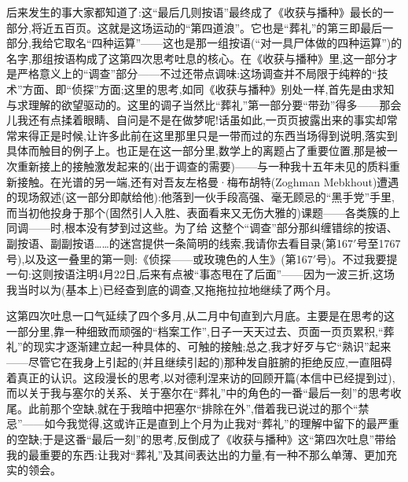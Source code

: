 后来发生的事大家都知道了:这“最后几则按语”最终成了《收获与播种》最长的一部分,将近五百页。这就是这场运动的“第四道浪”。它也是“葬礼”的第三即最后一部分,我给它取名“四种运算”——这也是那一组按语(“对一具尸体做的四种运算”)的名字,那组按语构成了这第四次思考吐息的核心。在《收获与播种》里,这一部分才是严格意义上的“调查”部分——不过还带点调味:这场调查并不局限于纯粹的“技术”方面、即“侦探”方面;这里的思考,如同《收获与播种》别处一样,首先是由求知与求理解的欲望驱动的。这里的调子当然比“葬礼”第一部分要“带劲”得多——那会儿我还有点揉着眼睛、自问是不是在做梦呢!话虽如此,一页页披露出来的事实却常常来得正是时候,让许多此前在这里那里只是一带而过的东西当场得到说明,落实到具体而触目的例子上。也正是在这一部分里,数学上的离题占了重要位置,那是被一次重新接上的接触激发起来的(出于调查的需要)——与一种我十五年未见的质料重新接触。在光谱的另一端,还有对吾友左格曼·梅布胡特(Zoghman Mebkhout)遭遇的现场叙述(这一部分即献给他):他落到一伙手段高强、毫无顾忌的“黑手党”手里,而当初他投身于那个(固然引人入胜、表面看来又无伤大雅的)课题——各类簇的上同调——时,根本没有梦到过这些。为了给
%
这整个“调查”部分那纠缠错综的按语、副按语、副副按语……的迷宫提供一条简明的线索,我请你去看目录(第167$'$号至1767号),以及这一叠里的第一则:《侦探——或玫瑰色的人生》(第167$'$号)。不过我要提一句:这则按语注明4月22日,后来有点被“事态甩在了后面”——因为一波三折,这场我当时以为(基本上)已经查到底的调查,又拖拖拉拉地继续了两个月。

这第四次吐息一口气延续了四个多月,从二月中旬直到六月底。主要是在思考的这一部分里,靠一种细致而顽强的“档案工作”,日子一天天过去、页面一页页累积,“葬礼”的现实才逐渐建立起一种具体的、可触的接触;总之,我才好歹与它“熟识”起来——尽管它在我身上引起的(并且继续引起的)那种发自脏腑的拒绝反应,一直阻碍着真正的认识。这段漫长的思考,以对德利涅来访的回顾开篇(本信中已经提到过),而以关于我与塞尔的关系、关于塞尔在“葬礼”中的角色的一番“最后一刻”的思考收尾。此前那个空缺,就在于我暗中把塞尔“排除在外”,借着我已说过的那个“禁忌”——如今我觉得,这或许正是直到上个月为止我对“葬礼”的理解中留下的最严重的空缺;于是这番“最后一刻”的思考,反倒成了《收获与播种》这“第四次吐息”带给我的最重要的东西:让我对“葬礼”及其间表达出的力量,有一种不那么单薄、更加充实的领会。

